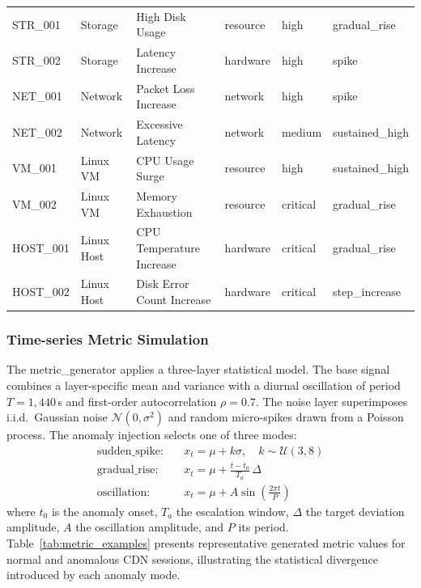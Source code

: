 \documentclass[5p, times]{elsarticle}
\begin{document}
\begin{table}[htbp]
{\begin{tabular}{@{}llllll@{}}
STR\_001  & Storage                 & High Disk Usage                 & resource & high     & gradual\_rise   \\
STR\_002  & Storage                 & Latency Increase                & hardware & high     & spike           \\
NET\_001  & Network                 & Packet Loss Increase            & network  & high     & spike           \\
NET\_002  & Network                 & Excessive Latency               & network  & medium   & sustained\_high \\
VM\_001   & Linux VM                & CPU Usage Surge                 & resource & high     & sustained\_high \\
VM\_002   & Linux VM                & Memory Exhaustion               & resource & critical & gradual\_rise   \\
HOST\_001 & Linux Host              & CPU Temperature Increase        & hardware & critical & gradual\_rise   \\
HOST\_002 & Linux Host              & Disk Error Count Increase       & hardware & critical & step\_increase  \\ \bottomrule
\end{tabular}}
\end{table}

\subsubsection{Time-series Metric Simulation}
The metric\_generator applies a three-layer statistical model. The base signal combines a layer-specific mean and variance with a diurnal oscillation of period $T = 1{,}440$\,s and first-order autocorrelation $\rho = 0.7$. The noise layer
superimposes i.i.d.\ Gaussian noise $\mathcal{N}(0,\sigma^2)$ and random micro-spikes drawn from a Poisson process. The anomaly injection selects one of three modes:
\begin{align}
    \text{sudden\_spike:}\quad & x_t = \mu + k\sigma,\quad
        k \sim \mathcal{U}(3,8) \label{eq:spike}\\
    \text{gradual\_rise:}\quad & x_t = \mu +
        \frac{t - t_0}{T_a}\,\Delta \label{eq:rise}\\
    \text{oscillation:}\quad   & x_t = \mu +
        A\sin\!\left(\tfrac{2\pi t}{P}\right) \label{eq:osc}
\end{align}
where $t_0$ is the anomaly onset, $T_a$ the escalation window, $\Delta$ the target deviation amplitude, $A$ the oscillation amplitude, and $P$ its period. Table~\ref{tab:metric_examples}
presents representative generated metric values for normal and anomalous CDN sessions, illustrating the statistical divergence introduced by each anomaly mode.
\end{document}
